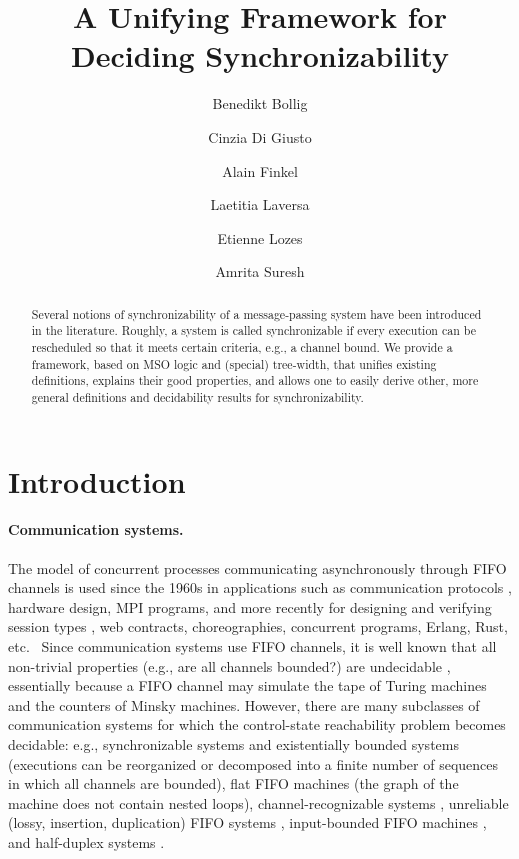 \documentclass[a4paper,UKenglish,cleveref, autoref, thm-restate]{lipics-v2021}
\title{A Unifying Framework for Deciding Synchronizability}
\author{Benedikt Bollig}
       {Universit{\'e} Paris-Saclay, ENS Paris-Saclay, CNRS, LMF, France}
       {bollig@lsv.ens-cachan.fr}
       {https://orcid.org/0000-0003-0985-6115}{}
\author{Cinzia Di Giusto}
       {Universit{\'e} C\^{o}te d’Azur, CNRS, I3S, France}
       {cinzia.di-giusto@univ-cotedazur.fr}
       {https://orcid.org/0000-0003-1563-6581}{}
\author{Alain Finkel}
       {Universit{\'e} Paris-Saclay, ENS Paris-Saclay, CNRS, LMF, France \and
         Institut Universitaire de France}
       {finkel@lsv.fr}
       {https://orcid.org/0000-0003-0702-3232}{}
\author{Laetitia Laversa}
       {Universit{\'e} C\^{o}te d’Azur, CNRS, I3S, France}
       {laetitia.laversa@univ-cotedazur.fr}
       {https://orcid.org/0000-0003-3775-6496}{}
\author{Etienne Lozes}
       {Universit{\'e} C\^{o}te d’Azur, CNRS, I3S, France}
       {etienne.lozes@univ-cotedazur.fr}
       {https://orcid.org/0000-0001-8505-585X}{}
\author{Amrita Suresh}
       {Universit{\'e} Paris-Saclay, ENS Paris-Saclay, CNRS, LMF, France}
       {amrita.suresh@ens-paris-saclay.fr}
       {https://orcid.org/0000-0001-6819-9093}{}
\begin{document}
\maketitle

\begin{abstract}
Several notions of synchronizability of a message-passing
system have been introduced in the literature. Roughly, a
system is called synchronizable if every execution
can be rescheduled so that it meets certain criteria, e.g.,
a channel bound. We provide a framework, based on MSO
logic and (special) tree-width, that unifies existing definitions,
explains their good properties, and allows one to easily derive other,
more general definitions and decidability results for synchronizability.

\end{abstract}

\section{Introduction}

\paragraph*{Communication systems.}
The model of concurrent processes communicating asynchronously through FIFO channels is used since the 1960s in  applications such as communication protocols \cite{DBLP:journals/sigops/Bochmann75}, hardware design, MPI
programs, and more recently for designing and verifying session types \cite{DBLP:journals/corr/abs-1901-09606}, web contracts, choreo\-graphies, concurrent programs, Erlang, Rust, etc.
~Since communication systems use FIFO channels, it is well known that all non-trivial properties (e.g., are all channels bounded?) are undecidable \cite{DBLP:journals/jacm/BrandZ83}, essentially because a FIFO channel may simulate the tape of Turing machines and the counters of Minsky machines.
%
However, there are many subclasses of communication systems for which the control-state reachability problem becomes decidable: e.g., synchronizable systems and existentially bounded systems (executions can be reorganized or decomposed into a finite number of sequences in which all channels are bounded), flat FIFO machines \cite{EGM2012,FP-lmcs20} (the graph of the machine does not contain nested loops), channel-recognizable systems \cite{DBLP:conf/cav/BoigelotG96}, unreliable (lossy, insertion, duplication) FIFO systems \cite{GC-AF-SPI-IC-96}, input-bounded FIFO machines \cite{BDM-concur20}, and half-duplex systems \cite{CF-icomp05}.
\end{document}
